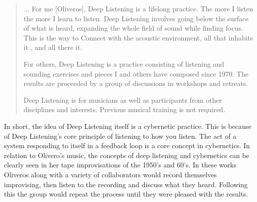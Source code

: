 \begin{quote}
    ... For me [Oliveros], Deep Listening is a lifelong practice. The more I listen the more I learn to listen. Deep Listening involves going below the surface of what is heard, expanding the whole field of sound while finding focus. This is the way to Connect with the acoustic environment, all that inhabits it , and all there it.

    For others, Deep Listening is a practice consisting of listening and sounding exercises and pieces I and others have composed since 1970. The results are proceeded by a group of discussions in workshops and retreats. 

    Deep Listening is for musicians as well as participants from other disciplines and interests. Previous musical training is not required.\cite{cultureandHumanity2002}
\end{quote}

In short, the idea of Deep Listening itself is a cybernetic practice.\cite{gordosOliverosCybernetics} This is because of Deep Listening's core principle of listening to how you listen. The act of a system responding to itself in a feedback loop is a core concept in cybernetics. In relation to Olivero's music, the concepts of deep listening and cybernetics can be clearly seen in her tape improvisations of the 1950's and 60's. In these works Oliveros along with a variety of collaborators would record themselves improvising, then listen to the recording and discuss what they heard. Following this the group would repeat the process until they were pleased with the results.\cite{gordosOliverosCybernetics} 







